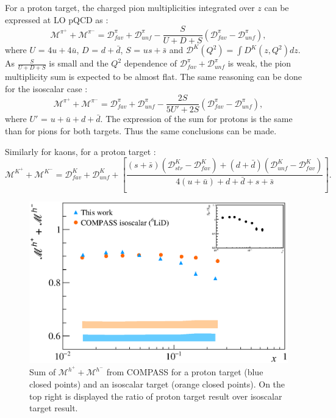 For a proton target, the charged pion multiplicities integrated over $z$ can be expressed at LO pQCD as :
%
\begin{equation}\label{eq:pisum}
  \mathscr{M}^{\pi^+}+\mathscr{M}^{\pi^-} = \mathscr{D}^{\pi}_{fav} + \mathscr{D}^{\pi}_{unf} - \frac{S}{U+D+S} \left( \mathscr{D}^{\pi}_{fav} - \mathscr{D}^{\pi}_{unf} \right),
\end{equation}
%
where $U$ = $4u+4\bar{u}$, $D$ = $d+\bar{d}$, $S$ = $us+\bar{s}$ and $\mathscr{D}^K(Q^2) = \int D^K(z,Q^2) dz $. As $\frac{S}{U+D+S}$ is small and the $Q^2$ dependence of $\mathscr{D}^{\pi}_{fav} + \mathscr{D}^{\pi}_{unf}$ is weak, the pion multiplicity sum is expected to be almost flat. The same reasoning can be done for the isoscalar case :
%
\begin{equation}
  \mathscr{M}^{\pi^+}+\mathscr{M}^{\pi^-} = \mathscr{D}^{\pi}_{fav} + \mathscr{D}^{\pi}_{unf} - \frac{2S}{5U'+2S} \left( \mathscr{D}^{\pi}_{fav} - \mathscr{D}^{\pi}_{unf} \right),
\end{equation}
%
where $U'$ = $u+\bar{u}+d+\bar{d}$. The expression of the sum for protons is the same than for pions for both targets. Thus the same conclusions can be made.

Similarly for kaons, for a proton target :
%
\begin{equation}
  \mathscr{M}^{K^+}+\mathscr{M}^{K^-} = \mathscr{D}^K_{fav}+\mathscr{D}^K_{unf}+\left[\frac{(s+\bar{s})\left( \mathscr{D}^K_{str}-\mathscr{D}^K_{fav} \right) + (d+\bar{d})\left( \mathscr{D}^K_{unf}-\mathscr{D}^K_{fav} \right)}{4(u+\bar{u}) + d + \bar{d} + s + \bar{s}} \right].
\end{equation}
%
\newpage

\begin{figure}[!h]
  \centering
	\includegraphics[scale=0.5]{./gfx/Mult_h_sum.eps}
	\caption{Sum of $\mathscr{M}^{h^+}+\mathscr{M}^{h^-}$ from COMPASS for a proton target (blue closed points) and an isoscalar target (orange closed points). On the top right is displayed the ratio of proton target result over isoscalar target result.}
	\label{pic:hsum}
\end{figure}


